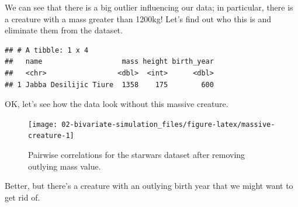 \documentclass[]{book}
\newenvironment{Shaded}{\begin{snugshade}}{\end{snugshade}}
\newcommand{\DecValTok}[1]{\textcolor[rgb]{0.00,0.00,0.81}{#1}}
\newcommand{\KeywordTok}[1]{\textcolor[rgb]{0.13,0.29,0.53}{\textbf{#1}}}
\newcommand{\NormalTok}[1]{#1}
\newcommand{\OperatorTok}[1]{\textcolor[rgb]{0.81,0.36,0.00}{\textbf{#1}}}
\newcommand{\StringTok}[1]{\textcolor[rgb]{0.31,0.60,0.02}{#1}}
\begin{document}
We can see that there is a big outlier influencing our data; in particular, there is a creature with a mass greater than 1200kg! Let's find out who this is and eliminate them from the dataset.

\begin{Shaded}
\end{Shaded}

\begin{verbatim}
## # A tibble: 1 x 4
##   name                   mass height birth_year
##   <chr>                 <dbl>  <int>      <dbl>
## 1 Jabba Desilijic Tiure  1358    175        600
\end{verbatim}

OK, let's see how the data look without this massive creature.

\begin{Shaded}
\end{Shaded}

\begin{figure}

{\centering \texttt{[image: 02-bivariate-simulation\_files/figure-latex/massive-creature-1]} 

}

\caption{Pairwise correlations for the starwars dataset after removing outlying mass value.}\label{fig:massive-creature}
\end{figure}

Better, but there's a creature with an outlying birth year that we might want to get rid of.

\begin{Shaded}
\end{Shaded}
\end{document}
